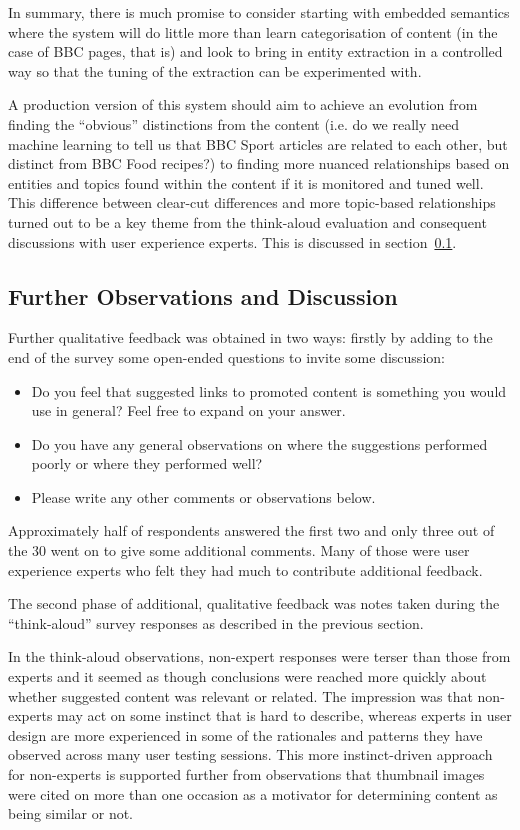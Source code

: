 In summary, there is much promise to consider starting with
embedded semantics where the system will do little more than learn
categorisation of content (in the case of BBC pages, that is) and
look to bring in entity extraction in a controlled way so that
the tuning of the extraction can be experimented with.

A production version of this system should aim to achieve an evolution
from finding the ``obvious'' distinctions from the content (i.e.
do we really need machine learning to tell us that BBC Sport articles
are related to each other, but distinct from BBC Food recipes?) to
finding more nuanced relationships based on entities and topics found
within the content if it is monitored and tuned well. This difference
between clear-cut differences and more topic-based relationships
turned out to be a key theme from the think-aloud evaluation and
consequent discussions with user experience experts. This is
discussed in section~\ref{sec:eval-obs}.

\subsection{Further Observations and Discussion}
\label{sec:eval-obs}

Further qualitative feedback was obtained in two ways: firstly by
adding to the end of the survey some open-ended questions to invite
some discussion:

\begin{itemize}
  \item Do you feel that suggested links to promoted content is something you would use in general? Feel free to expand on your answer.
  \item Do you have any general observations on where the suggestions performed poorly or where they performed well?
  \item Please write any other comments or observations below.
\end{itemize}

Approximately half of respondents answered the first two and only
three out of the 30 went on to give some additional comments. Many
of those were user experience experts who felt they had much to
contribute additional feedback.

The second phase of additional, qualitative feedback was notes taken
during the ``think-aloud'' survey responses as described in
the previous section.

In the think-aloud observations, non-expert responses were terser
than those from experts and it seemed as though conclusions were
reached more quickly about
whether suggested content was relevant or related. The impression was
that non-experts may act on some instinct that is hard to
describe, whereas experts in user design are more experienced in
some of the rationales and patterns they have observed across many
user testing sessions. This more instinct-driven approach for
non-experts is supported further from observations that thumbnail
images were cited on more than one occasion as a motivator for
determining content as being similar or not.

